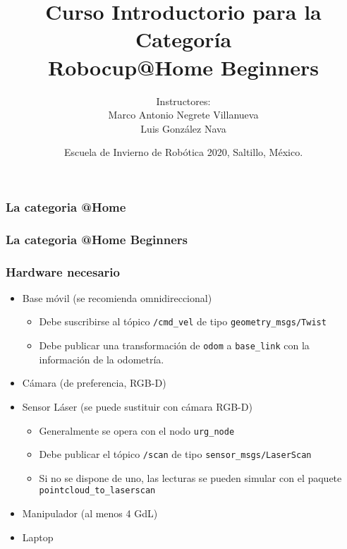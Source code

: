 \documentclass[10pt,spanish,aspectratio=1610]{beamer}
\begin{document}
\renewcommand{\tablename}{Tabla}
\renewcommand{\figurename}{Figura}

\title[Robocup@Home Beginners]{Curso Introductorio para la Categoría\\Robocup@Home Beginners}
\author[Marco Negrete y Luis González]{Instructores: \\ Marco Antonio Negrete Villanueva \\ Luis González Nava}
\date[EIR 2020]{Escuela de Invierno de Robótica 2020, Saltillo, México.}

\begin{frame}
\titlepage
\end{frame}

\begin{frame}\frametitle{La categoria @Home}
  
\end{frame}

\begin{frame}\frametitle{La categoria @Home Beginners}
  
\end{frame}

\begin{frame}\frametitle{Hardware necesario}
  \begin{itemize}
  \item Base móvil (se recomienda omnidireccional)
    \begin{itemize}
    \item Debe suscribirse al tópico \texttt{/cmd\_vel} de tipo \texttt{geometry\_msgs/Twist}
    \item Debe publicar una transformación de \texttt{odom} a \texttt{base\_link} con la información de la odometría.
    \end{itemize}
  \item Cámara (de preferencia, RGB-D)
  \item Sensor Láser (se puede sustituir con cámara RGB-D)
    \begin{itemize}
    \item Generalmente se opera con el nodo \texttt{urg\_node}
    \item Debe publicar el tópico \texttt{/scan} de tipo \texttt{sensor\_msgs/LaserScan}
      \item Si no se dispone de uno, las lecturas se pueden simular con el paquete \texttt{pointcloud\_to\_laserscan}
    \end{itemize}
  \item Manipulador (al menos 4 GdL)
  \item Laptop
  \end{itemize}
\end{frame}
\end{document}
